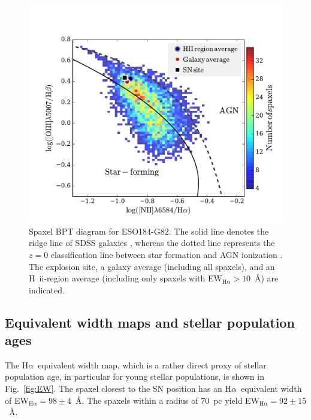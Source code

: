 \documentclass[traditabstract]{aa}
\newcommand{\ha}{H$\alpha$}
\newcommand{\hii}{\mbox{H~{\sc ii}}}
\begin{document}
\begin{figure}
\begin{center}
  \includegraphics[width=0.99\linewidth]{Figs/MUSE_SN1998bw_BPT.pdf}
\caption{Spaxel BPT diagram for ESO184-G82. The solid line denotes the ridge line of SDSS galaxies \citep{2008MNRAS.385..769B}, whereas the dotted line represents the $z=0$ classification line between star formation and AGN ionization \citep{2013ApJ...774..100K}. The  explosion site, a galaxy average (including all spaxels), and an \hii-region average (including only spaxels with EW$_{\mathrm{H\alpha}}>10$~\AA) are indicated.}
\label{fig:BPT}
\end{center}
\end{figure}

\subsection{Equivalent width maps and stellar population ages}

The \ha~equivalent width map, which is a rather direct proxy of stellar population age, in particular for young stellar populations, is shown in Fig.~\ref{fig:EW}. The spaxel closest to the SN position has an \ha~equivalent width of EW$_{\mathrm{H\alpha}}=98\pm4$~\AA. The spaxels within a radius of 70~pc yield EW$_{\mathrm{H\alpha}}=92\pm15$~\AA. 
\end{document}
